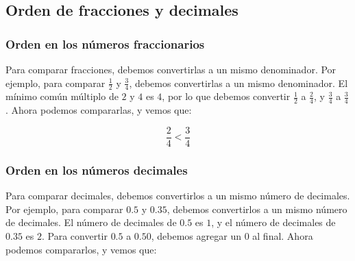 \documentclass[12pt]{book}
\begin{document}
\begin{mainmatter}
    \subsection{Orden de fracciones y decimales}

    \subsubsection{Orden en los n\'umeros fraccionarios}
    Para comparar fracciones, debemos convertirlas a un mismo denominador. Por ejemplo, para comparar $\frac{1}{2}$ y $\frac{3}{4}$, debemos convertirlas a un mismo denominador. El mínimo común múltiplo de $2$ y $4$ es $4$, por lo que debemos convertir $\frac{1}{2}$ a $\frac{2}{4}$, y $\frac{3}{4}$ a $\frac{3}{4}$. Ahora podemos compararlas, y vemos que:

    \[\frac{2}{4}<\frac{3}{4}\]

    \begin{center}
    \end{center}

    \subsubsection{Orden en los n\'umeros decimales}

    Para comparar decimales, debemos convertirlos a un mismo número de decimales. Por ejemplo, para comparar $0.5$ y $0.35$, debemos convertirlos a un mismo número de decimales. El número de decimales de $0.5$ es $1$, y el número de decimales de $0.35$ es $2$. Para convertir $0.5$ a $0.50$, debemos agregar un $0$ al final. Ahora podemos compararlos, y vemos que:


\end{mainmatter}
\end{document}
